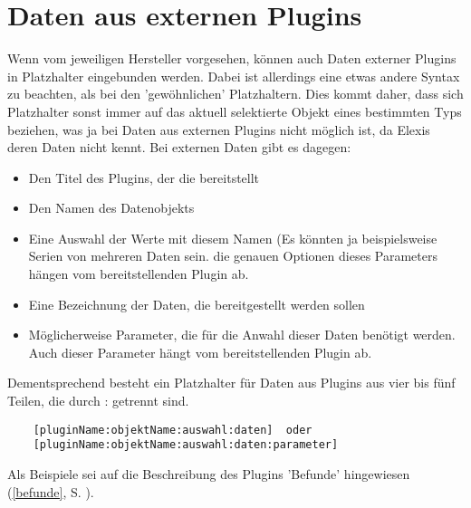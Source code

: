 \section{Daten aus externen Plugins}
\label{datenfelder_extern}
Wenn vom jeweiligen Hersteller vorgesehen, können auch Daten externer Plugins in Platzhalter eingebunden werden. Dabei ist allerdings eine etwas andere Syntax zu beachten, als bei den 'gewöhnlichen' Platzhaltern. Dies kommt daher, dass sich Platzhalter sonst immer auf das aktuell selektierte Objekt eines bestimmten Typs beziehen, was ja bei Daten aus externen Plugins nicht möglich ist, da Elexis deren Daten nicht kennt. Bei externen Daten gibt es dagegen:
\begin{itemize}
\item Den Titel des Plugins, der die bereitstellt
\item Den Namen des Datenobjekts 
\item Eine Auswahl der Werte mit diesem Namen (Es könnten ja beispielsweise Serien von mehreren Daten sein. die genauen Optionen dieses Parameters hängen vom bereitstellenden Plugin ab.
\item Eine Bezeichnung der Daten, die bereitgestellt werden sollen
\item Möglicherweise Parameter, die für die Anwahl dieser Daten benötigt werden. Auch dieser Parameter hängt vom bereitstellenden Plugin ab.
\end{itemize}
Dementsprechend besteht ein Platzhalter für Daten aus Plugins aus vier bis fünf Teilen, die durch : getrennt sind.
\begin{verbatim}
    [pluginName:objektName:auswahl:daten]  oder
    [pluginName:objektName:auswahl:daten:parameter]
\end{verbatim}

\medskip

Als Beispiele sei auf die Beschreibung des Plugins 'Befunde' hingewiesen (\ref{befunde}, S. \pageref{befunde}).
